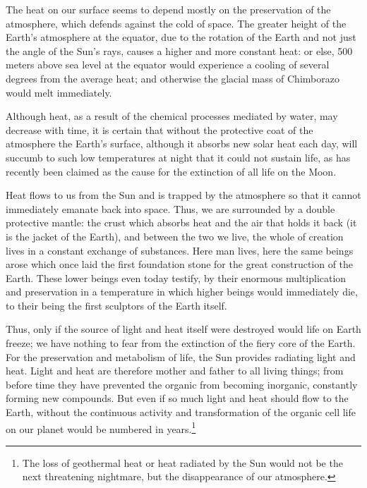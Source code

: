 \documentclass[a4paper, 12pt, oneside]{article}
\begin{document}
The heat on our surface seems to depend mostly on the preservation of the atmosphere, which defends against the cold of space. The greater height of the Earth's atmosphere at the equator, due to the rotation of the Earth and not just the angle of the Sun's rays, causes a higher and more constant heat: or else, 500 meters above sea level at the equator would experience a cooling of several degrees from the average heat; and otherwise the glacial mass of Chimborazo would melt immediately.

Although heat, as a result of the chemical processes mediated by water, may decrease with time, it is certain that without the protective coat of the atmosphere the Earth's surface, although it absorbs new solar heat each day, will succumb to such low temperatures at night that it could not sustain life, as has recently been claimed as the cause for the extinction of all life on the Moon.

Heat flows to us from the Sun and is trapped by the atmosphere so that it cannot immediately emanate back into space. Thus, we are surrounded by a double protective mantle: the crust which absorbs heat and the air that holds it back (it is the jacket of the Earth), and between the two we live, the whole of creation lives in a constant exchange of substances. Here man lives, here the same beings arose which once laid the first foundation stone for the great construction of the Earth. These lower beings even today testify, by their enormous multiplication and preservation in a temperature in which higher beings would immediately die, to their being the first sculptors of the Earth itself.

Thus, only if the source of light and heat itself were destroyed would life on Earth freeze; we have nothing to fear from the extinction of the fiery core of the Earth. For the preservation and metabolism of life, the Sun provides radiating light and heat. Light and heat are therefore mother and father to all living things; from before time they have prevented the organic from becoming inorganic, constantly forming new compounds. But even if so much light and heat should flow to the Earth, without the continuous activity and transformation of the organic cell life on our planet would be numbered in years.\footnote{The loss of geothermal heat or heat radiated by the Sun would not be the next threatening nightmare, but the disappearance of our atmosphere.}
\end{document}
